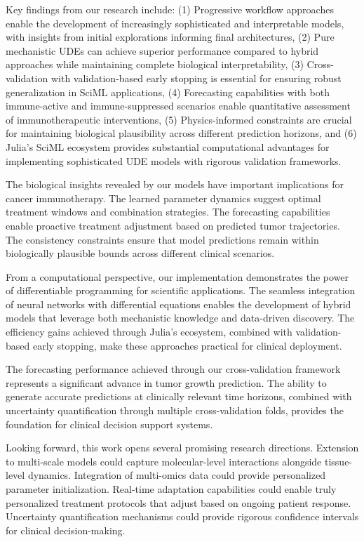 \documentclass{juliacon}
\begin{document}
Key findings from our research include: (1) Progressive workflow approaches enable the development of increasingly sophisticated and interpretable models, with insights from initial explorations informing final architectures, (2) Pure mechanistic UDEs can achieve superior performance compared to hybrid approaches while maintaining complete biological interpretability, (3) Cross-validation with validation-based early stopping is essential for ensuring robust generalization in SciML applications, (4) Forecasting capabilities with both immune-active and immune-suppressed scenarios enable quantitative assessment of immunotherapeutic interventions, (5) Physics-informed constraints are crucial for maintaining biological plausibility across different prediction horizons, and (6) Julia's SciML ecosystem provides substantial computational advantages for implementing sophisticated UDE models with rigorous validation frameworks.

The biological insights revealed by our models have important implications for cancer immunotherapy. The learned parameter dynamics suggest optimal treatment windows and combination strategies. The forecasting capabilities enable proactive treatment adjustment based on predicted tumor trajectories. The consistency constraints ensure that model predictions remain within biologically plausible bounds across different clinical scenarios.

From a computational perspective, our implementation demonstrates the power of differentiable programming for scientific applications. The seamless integration of neural networks with differential equations enables the development of hybrid models that leverage both mechanistic knowledge and data-driven discovery. The efficiency gains achieved through Julia's ecosystem, combined with validation-based early stopping, make these approaches practical for clinical deployment.

The forecasting performance achieved through our cross-validation framework represents a significant advance in tumor growth prediction. The ability to generate accurate predictions at clinically relevant time horizons, combined with uncertainty quantification through multiple cross-validation folds, provides the foundation for clinical decision support systems.

Looking forward, this work opens several promising research directions. Extension to multi-scale models could capture molecular-level interactions alongside tissue-level dynamics. Integration of multi-omics data could provide personalized parameter initialization. Real-time adaptation capabilities could enable truly personalized treatment protocols that adjust based on ongoing patient response. Uncertainty quantification mechanisms could provide rigorous confidence intervals for clinical decision-making.
\end{document}
